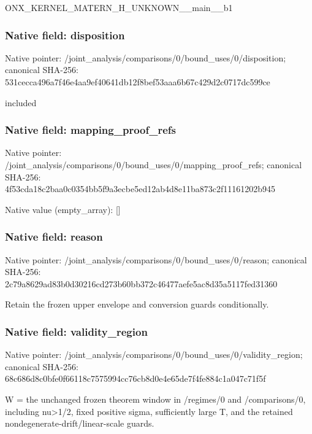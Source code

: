 \documentclass[10pt,a4paper]{article}
\begin{document}
\begingroup\raggedright\sloppy ONX\_\allowbreak{}KERNEL\_\allowbreak{}MATERN\_\allowbreak{}H\_\allowbreak{}UNKNOWN\_\allowbreak{}\_\allowbreak{}main\_\allowbreak{}\_\allowbreak{}b1\par\endgroup

\subsubsection{Native field: disposition}
Native pointer: /joint\_\allowbreak{}analysis/comparisons/0/bound\_\allowbreak{}uses/0/disposition; canonical SHA-256: 531cecca496a7f46e4aa9ef40641db12f8bef53aaa6b67c429d2c0717dc599ce

\begingroup\raggedright\sloppy included\par\endgroup

\subsubsection{Native field: mapping\_\allowbreak{}proof\_\allowbreak{}refs}
Native pointer: /joint\_\allowbreak{}analysis/comparisons/0/bound\_\allowbreak{}uses/0/mapping\_\allowbreak{}proof\_\allowbreak{}refs; canonical SHA-256: 4f53cda18c2baa0c0354bb5f9a3ecbe5ed12ab4d8e11ba873c2f11161202b945

Native value (empty\_\allowbreak{}array): []

\subsubsection{Native field: reason}
Native pointer: /joint\_\allowbreak{}analysis/comparisons/0/bound\_\allowbreak{}uses/0/reason; canonical SHA-256: 2c79a8629ad83b0d30216cd273b60bb372c46477aefe5ac8d35a5117fed31360

\begingroup\raggedright\sloppy Retain the frozen upper envelope and conversion guards conditionally.\par\endgroup

\subsubsection{Native field: validity\_\allowbreak{}region}
Native pointer: /joint\_\allowbreak{}analysis/comparisons/0/bound\_\allowbreak{}uses/0/validity\_\allowbreak{}region; canonical SHA-256: 68c686d8c0bfe0f66118c7575994cc76cb8d0e4e65de7f4fe884c1a047c71f5f

\begingroup\raggedright\sloppy W =\allowbreak{} the unchanged frozen theorem window in /\allowbreak{}regimes/\allowbreak{}0 and /\allowbreak{}comparisons/\allowbreak{}0,\allowbreak{} including nu>1/\allowbreak{}2,\allowbreak{} fixed positive sigma,\allowbreak{} sufficiently large T,\allowbreak{} and the retained nondegenerate-drift/\allowbreak{}linear-scale guards.\par\endgroup
\end{document}
